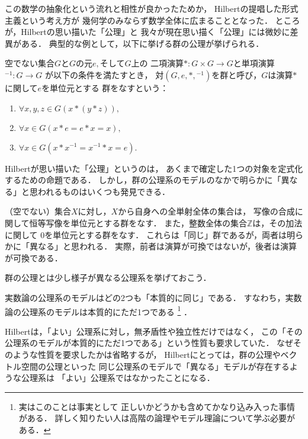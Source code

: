   この数学の抽象化という流れと相性が良かったためか，
  Hilbertの提唱した形式主義という考え方が
  幾何学のみならず数学全体に広まることとなった．
  ところが，Hilbertの思い描いた「公理」と
  我々が現在思い描く「公理」には微妙に差異がある．
  典型的な例として，以下に挙げる群の公理が挙げられる．
  \begin{axiom}[群の公理] \label{axiom:group}
    空でない集合$G$と$G$の元$e,$そして$G$上の
    二項演算$\ast : G \times G \longrightarrow G$と単項演算${} ^{-1} : G \to G$
    が以下の条件を満たすとき，
    対$(G,e, \ast , {} ^{-1})$を群と呼び，$G$は演算$\ast$に関して$e$を単位元とする
    群をなすという：
    \begin{enumerate}[G1. ]
      \item $\forall x, y, z \in G (x \ast ( y \ast z)) ,$
      \item $ \forall x \in G (x \ast e = e \ast x = x),$
      \item $\forall x \in G (x \ast x^{-1} = x^{-1} \ast x = e).$
    \end{enumerate}
  \end{axiom}
  Hilbertが思い描いた「公理」というのは，
  あくまで確定した1つの対象を定式化するための命題である．
  しかし，群の公理系のモデルのなかで明らかに「異なる」と思われるものはいくつも発見できる．

  \begin{ex} \label{ex:groupmodel}
    （空でない）集合$X$に対し，$X$から自身への全単射全体の集合は，
    写像の合成に関して恒等写像を単位元とする群をなす．
    また，整数全体の集合$\mathbb{Z}$は，その加法に関して
    $0$を単位元とする群をなす．
    これらは「同じ」群であるが，両者は明らかに「異なる」と思われる．
    実際，前者は演算が可換ではないが，後者は演算が可換である．
  \end{ex}

  群の公理とは少し様子が異なる公理系を挙げておこう．

  \begin{ex} \label{ex:hilbertaxiom}
    実数論の公理系のモデルはどの2つも「本質的に同じ」である．
    すなわち，実数論の公理系のモデルは本質的にただ1つである
    \footnote{実はこのことは事実として
    正しいかどうかも含めてかなり込み入った事情がある．
    詳しく知りたい人は高階の論理やモデル理論について学ぶ必要がある．}
    ．
  \end{ex}

  Hilbertは，「よい」公理系に対し，無矛盾性や独立性だけではなく，
  この「その公理系のモデルが本質的にただ1つである」という性質も要求していた．
  なぜそのような性質を要求したかは省略するが，
  Hilbertにとっては，群の公理やベクトル空間の公理といった
  同じ公理系のモデルで「異なる」モデルが存在するような公理系は
  「よい」公理系ではなかったことになる．

